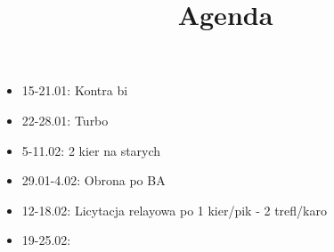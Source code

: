 \documentclass[12pt]{article}
\title{Agenda}
\date{}
\begin{document}
\maketitle
\begin{itemize}
    \item 15-21.01: Kontra bi
    \item 22-28.01: Turbo
    \item 5-11.02: 2 kier na starych
    \item 29.01-4.02: Obrona po BA
    \item 12-18.02: Licytacja relayowa po 1 kier/pik - 2 trefl/karo
    \item 19-25.02: 
\end{itemize}
\end{document}
